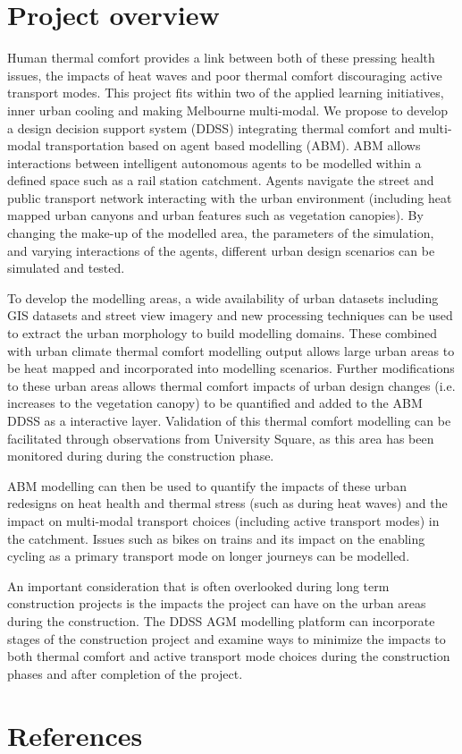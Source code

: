 \documentclass[final,3p,times,authoryear]{elsarticle}
\begin{document}
\section{Project overview}
Human thermal comfort provides a link between both of these pressing health issues, the impacts of heat waves and poor thermal comfort discouraging active transport modes.  This project fits within two of the applied learning initiatives, inner urban cooling and making Melbourne multi-modal. We propose to develop a design decision support system (DDSS) integrating thermal comfort and multi-modal transportation based on agent based modelling (ABM). ABM allows interactions between intelligent autonomous agents to be modelled within a defined space such as a rail station catchment. Agents navigate the street and public transport network interacting with the urban environment (including heat mapped urban canyons and urban features such as vegetation canopies). By changing the make-up of the modelled area, the parameters of the simulation, and varying interactions of the agents, different urban design scenarios can be simulated and tested.

To develop the modelling areas, a wide availability of urban datasets including GIS datasets and street view imagery and new processing techniques can be used to extract the urban morphology to build modelling domains. These combined with urban climate thermal comfort modelling output allows large urban areas to be heat mapped and incorporated into modelling scenarios. Further modifications to these urban areas allows thermal comfort impacts of urban design changes (i.e. increases to the vegetation canopy) to be quantified and added to the ABM DDSS as a interactive layer. Validation of this thermal comfort modelling can be facilitated through observations from University Square, as this area has been monitored during during the construction phase.

ABM modelling can then be used to quantify the impacts of these urban redesigns on heat health and thermal stress (such as during heat waves) and the impact on multi-modal transport choices (including active transport modes) in the catchment. Issues such as bikes on trains and its impact on the enabling cycling as a primary transport mode on longer journeys can be modelled. 

An important consideration that is often overlooked during long term construction projects is the impacts the project can have on the urban areas during the construction. The DDSS AGM modelling platform can incorporate stages of the construction project and examine ways to minimize the impacts to both thermal comfort and active transport mode choices during the construction phases and after completion of the project. 


\section*{References}\label{sec:ref}
   
  
\end{document}
